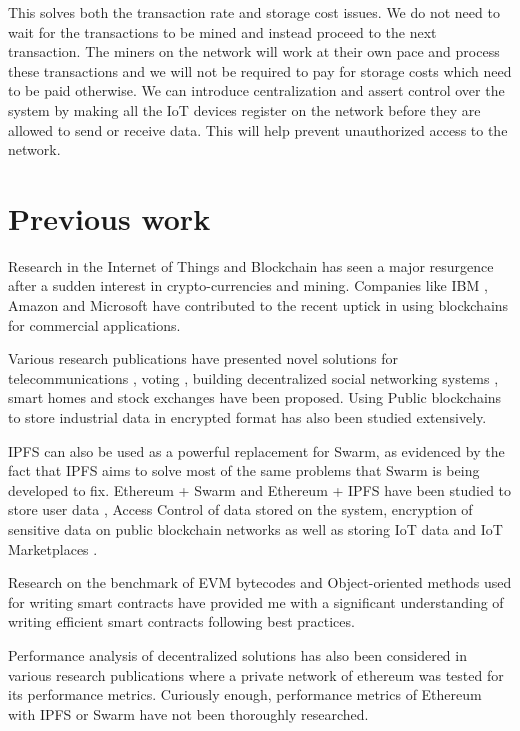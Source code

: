 \documentclass[11pt,openright]{report}
\begin{document}
This solves both the transaction rate and storage cost issues. We do not need to wait for the transactions to be mined and instead proceed to the next transaction. The miners on the network will work at their own pace and process these transactions and we will not be required to pay for storage costs which need to be paid otherwise. We can introduce centralization and assert control over the system by making all the IoT devices register on the network before they are allowed to send or receive data. This will help prevent unauthorized access to the network.

\section{Previous work}\label{section:previouswork}
Research in the Internet of Things and Blockchain has seen a major resurgence after a sudden interest in crypto-currencies and mining. Companies like IBM \cite{Androulaki:2018:HFD:3190508.3190538}, Amazon and Microsoft have contributed to the recent uptick in using blockchains for commercial applications. 

Various research publications have presented novel solutions for telecommunications \cite{8441204}, voting \cite{8603050}, building decentralized social networking systems \cite{8645058}, smart homes\cite{8644880} and stock exchanges \cite{8516610} have been proposed. Using Public blockchains to store industrial data in encrypted format has also been studied extensively\cite{8622246}.

IPFS can also be used as a powerful replacement for Swarm, as evidenced by the fact that IPFS aims to solve most of the same problems that Swarm is being developed to fix. Ethereum + Swarm and Ethereum + IPFS have been studied to store user data \cite{8448350}, Access Control of data \cite{8400511} stored on the system, encryption of sensitive data on public blockchain networks \cite{8400511} as well as storing IoT data \cite{8634961} and IoT Marketplaces \cite{8525388}.

Research on the benchmark of EVM bytecodes \cite{8612882} and Object-oriented methods used for writing smart contracts \cite{8445056} have provided me with a significant understanding of writing efficient smart contracts following best practices. 

Performance analysis of decentralized solutions has also been considered in various research publications \cite{8342866} where a private network of ethereum was tested for its performance metrics. Curiously enough, performance metrics of Ethereum with IPFS or Swarm have not been thoroughly researched. 
\end{document}
